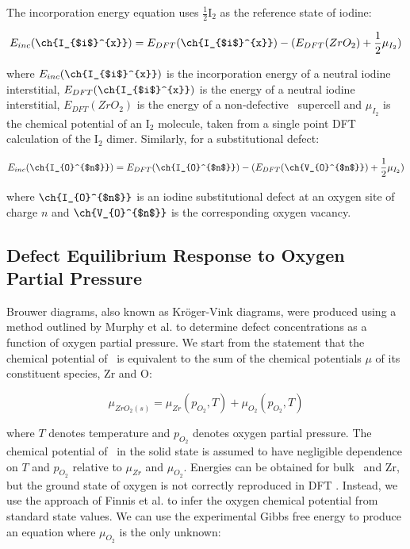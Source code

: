 The incorporation energy equation uses $\frac{1}{2}$I$_{2}$ as the reference state of iodine:

\begin{equation}
\label{interstitial_incorp_equation}
E_{inc}(\ch{I_{$i$}^{x}}) = E_{DFT}(\ch{I_{$i$}^{x}}) - (E_{DFT}(ZrO_2) + \frac{1}{2}\mu_{I_{2}})  %
\end{equation}

where $E_{inc}(\ch{I_{$i$}^{x}})$ is the incorporation energy of a neutral iodine interstitial, $E_{DFT}(\ch{I_{$i$}^{x}})$ is the energy of a neutral iodine interstitial, $E_{DFT}(ZrO_2)$ is the energy of a non-defective \zirconia\ supercell and $\mu_{I_{2}}$ is the chemical potential of an I$_{2}$ molecule, taken from a single point DFT calculation of the I$_{2}$ dimer. Similarly, for a substitutional defect:

\begin{equation}
\label{o_sub_incorp_equation}
E_{inc}(\ch{I_{O}^{$n$}}) = E_{DFT}(\ch{I_{O}^{$n$}}) - (E_{DFT}(\ch{V_{O}^{$n$}}) + \frac{1}{2}\mu_{I_{2}})  %
\end{equation}

where $\ch{I_{O}^{$n$}}$ is an iodine substitutional defect at an oxygen site of charge $n$ and $\ch{V_{O}^{$n$}}$ is the corresponding oxygen vacancy.


\subsection{Defect Equilibrium Response to Oxygen Partial Pressure}

Brouwer diagrams, also known as Kr{\"o}ger-Vink diagrams, were produced using a method outlined by Murphy et al. \cite{Murphy2014} to determine defect concentrations as a function of oxygen partial pressure. We start from the statement that the chemical potential of \zirconia\ is equivalent to the sum of the chemical potentials $\mu$ of its constituent species, Zr and O:

\begin{equation}
{\mu}_{ZrO_2(s)} = {\mu}_{Zr}(p_{O_2}, T) + {\mu}_{O_2}(p_{O_2}, T)
\label{mewZrO2}
\end{equation}

where $T$ denotes temperature and $p_{O_2}$ denotes oxygen partial pressure. The chemical potential of \zirconia\ in the solid state is assumed to have negligible dependence on $T$ and $p_{O_2}$ relative to ${\mu}_{Zr}$ and ${\mu}_{O_2}$. Energies can be obtained for bulk \zirconia\ and Zr, but the ground state of oxygen is not correctly reproduced in DFT \cite{Batyrev2000,Lozovoi2001}. Instead, we use the approach of Finnis et al. \cite{Finnis2005} to infer the oxygen chemical potential from standard state values. We can use the experimental Gibbs free energy to produce an equation where $\mu_{O_2}$ is the only unknown:

